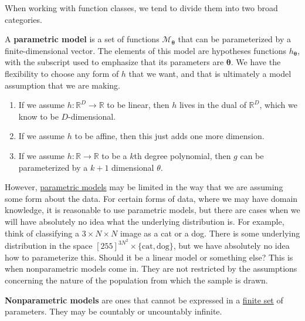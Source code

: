   When working with function classes, we tend to divide them into two broad categories. 

  \begin{definition}
    \label{def:parametric-models}
    A \textbf{parametric model} is a set of functions $\mathcal{M}_{\boldsymbol{\theta}}$ that can be parameterized by a finite-dimensional vector. The elements of this model are hypotheses functions $h_{\boldsymbol{\theta}}$, with the subscript used to emphasize that its parameters are $\boldsymbol{\theta}$. We have the flexibility to choose any form of $h$ that we want, and that is ultimately a model assumption that we are making. 
  \end{definition}

  \begin{example}
    \label{ex:examples-of-parametric-models}
    \begin{enumerate}
      \item If we assume $h: \mathbb{R}^D \rightarrow \mathbb{R}$ to be linear, then $h$ lives in the dual of $\mathbb{R}^D$, which we know to be $D$-dimensional. 
      \item If we assume $h$ to be affine, then this just adds one more dimension. 
      \item If we assume $h: \mathbb{R} \rightarrow \mathbb{R}$ to be a $k$th degree polynomial, then $g$ can be parameterized by a $k+1$ dimensional $\theta$. 
    \end{enumerate}
  \end{example}

  However, \hyperref[def:parametric-models]{parametric models} may be limited in the way that we are assuming some form about the data. For certain forms of data, where we may have domain knowledge, it is reasonable to use parametric models, but there are cases when we will have absolutely no idea what the underlying distribution is. For example, think of classifying a $3 \times N \times N$ image as a cat or a dog. There is some underlying distribution in the space $[255]^{3 N^2} \times \{\text{cat}, \text{dog}\}$, but we have absolutely no idea how to parameterize this. Should it be a linear model or something else? This is when nonparametric models come in. They are not restricted by the assumptions concerning the nature of the population from which the sample is drawn. 

  \begin{definition}
    \label{def:nonparametric-models}
    \textbf{Nonparametric models} are ones that cannot be expressed in a \hyperref[st-def:finite-set]{finite set} of parameters. They may be countably or uncountably infinite. 
  \end{definition}


